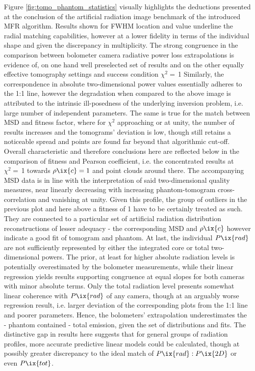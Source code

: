                Figure \ref{fig:tomo_phantom_statistics} visually highlights the deductions presented at the conclusion of the artificial radiation image benchmark of the introduced MFR algorithm. Results shown for FWHM location and value underline the radial matching capabilities, however at a lower fidelity in terms of the individual shape and given the discrepancy in multiplicity. The strong congruence in the comparison between bolometer camera radiative power loss extrapolations is evidence of, on one hand well preselected set of results and on the other equally effective tomography settings and success condition $\chi^{2}=$\,\SI{1}{\arbitraryunit} Similarly, the correspondence in absolute two-dimensional power values essentially adheres to the 1:1 line, however the degradation when compared to the above image is attributed to the intrinsic ill-posedness of the underlying inversion problem, i.e. large number of independent parameters. The same is true for the match between MSD and fitness factor, where for $\chi^{2}$ approaching or at unity, the number of results increases and the tomograms' deviation is low, though still retains a noticeable spread and points are found far beyond that algorithmic cut-off. Overall characteristic and therefore conclusions here are reflected below in the comparison of fitness and Pearson coefficient, i.e. the concentrated results at $\chi^{2}=$\,\SI{1}{\arbitraryunit} towards $\rho\ix{c}=1$ and point clouds around there. The accompanying MSD data is in line with the interpretation of said two-dimensional quality measures, near linearly decreasing with increasing phantom-tomogram cross-correlation and vanishing at unity. Given this profile, the group of outliers in the previous plot and here above a fitness of \SI{1}{\arbitraryunit} have to be certainly treated as such. They  are connected to a particular set of artificial radiation distribution reconstructions of lesser adequacy - the corresponding MSD and $\rho\ix{c}$ however indicate a good fit of tomogram and phantom. At last, the individual $P\ix{rad}$ are not sufficiently represented by either the integrated core or total two-dimensional powers. The prior, at least for higher absolute radiation levels is potentially overestimated by the bolometer measurements, while their linear regression yields results supporting congruence at equal slopes for both cameras with minor absolute terms. Only the total radiation level presents somewhat linear coherence with $P\ix{rad}$ of any camera, though at an arguably worse regression result, i.e. larger deviation of the corresponding plots from the 1:1 line and poorer parameters. Hence, the bolometers' extrapolation underestimates the - phantom contained - total emission, given the set of distributions and fits. The distinctive gap in results here suggests that for general groups of radiation profiles, more accurate predictive linear models could be calculated, though at possibly greater discrepancy to the ideal match of $P\ix{rad}:P\ix{2D}$ or even $P\ix{tot}$.%
%
